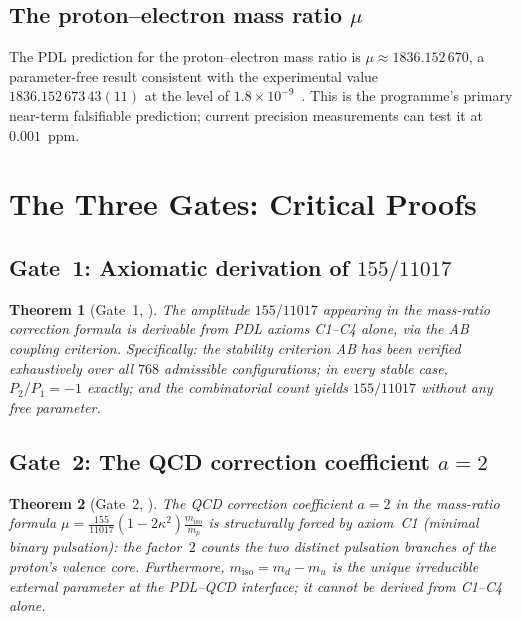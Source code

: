 \documentclass[11pt,a4paper]{article}
\theoremstyle{plain}
\newtheorem{theorem}{Theorem}[section]
\theoremstyle{definition}
\theoremstyle{remark}
\begin{document}
\subsection{The proton--electron mass ratio \texorpdfstring{$\mu$}{mu}}
\label{subsec:mu}
The PDL prediction for the proton--electron mass ratio is $\mu\approx 1836.152\,670$, a parameter-free result consistent with the experimental value $1836.152\,673\,43(11)$ at the level of $1.8\times10^{-9}$~\cite{D28,D29,D30}. This is the programme's primary near-term falsifiable prediction; current precision measurements can test it at $0.001$~ppm.

\section{The Three Gates: Critical Proofs}
\label{sec:gates}

\subsection{Gate~1: Axiomatic derivation of \texorpdfstring{$155/11017$}{155/11017}}
\label{subsec:gate1}
\begin{theorem}[Gate~1, \cite{D29}]
\label{thm:Gate1}
The amplitude $155/11017$ appearing in the mass-ratio correction formula is derivable from PDL axioms C1--C4 alone, via the AB coupling criterion. Specifically: the stability criterion AB has been verified exhaustively over all $768$ admissible configurations; in every stable case, $P_2/P_1=-1$ exactly; and the combinatorial count yields $155/11017$ without any free parameter.
\end{theorem}

\subsection{Gate~2: The QCD correction coefficient \texorpdfstring{$a=2$}{a=2}}
\label{subsec:gate2}
\begin{theorem}[Gate~2, \cite{D30}]
\label{thm:Gate2}
The QCD correction coefficient $a=2$ in the mass-ratio formula $\mu=\frac{155}{11017}(1-2\kappa^2)\frac{m_{\mathrm{iso}}}{m_p}$ is structurally forced by axiom~C1 (minimal binary pulsation): the factor~$2$ counts the two distinct pulsation branches of the proton's valence core. Furthermore, $m_{\mathrm{iso}}=m_d-m_u$ is the unique irreducible external parameter at the PDL--QCD interface; it cannot be derived from C1--C4 alone.
\end{theorem}
\end{document}
